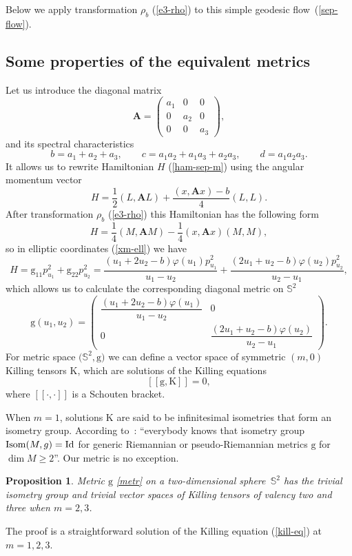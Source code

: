 \documentclass[10pt,a4paper]{amsart}
\numberwithin{equation}{section}
\newtheorem{Proposition}[Theorem]{Proposition}
 { \theoremstyle{definition}
\newtheorem{Definition}[Theorem]{Definition}
\newtheorem{Note}[Theorem]{Note}
\newtheorem{Example}[Theorem]{Example}
\newtheorem{Remark}[Theorem]{Remark} }
\begin{document}
Below we apply transformation $\rho_b$ (\ref{e3-rho}) to this simple geodesic flow~(\ref{sep-flow}).


\subsection{Some properties of the equivalent metrics}
Let us introduce the diagonal matrix
\[
\mathbf A=\left(
 \begin{matrix}
 {a}_1 & 0 & 0 \\
 0 & {a}_2 & 0 \\
 0 & 0 & {a}_3
 \end{matrix}
 \right) ,
\]
and its spectral characteristics
\begin{equation}\label{bcd}
b=a_1+a_2+a_3 ,\qquad c=a_1a_2+a_1a_3+a_2a_3 ,\qquad d=a_1a_2a_3.
\end{equation}
It allows us to rewrite Hamiltonian $H$ (\ref{ham-sep-m}) using the angular momentum vector
\[
H=\dfrac{1}{2}(L,\mathbf A L) +\dfrac{(x,\mathbf A x) - b}{4} (L,L) .
\]
After transformation $\rho_b$ (\ref{e3-rho}) this Hamiltonian has the following form
\begin{equation}\label{Hams}
H=\frac{1}{4}(M,\mathbf AM)-\frac{1}{4}(x,\mathbf Ax)(M,M) ,
\end{equation}
so in elliptic coordinates (\ref{xm-ell}) we have
\begin{equation}\label{H}
H= \mathrm g_{11} p_{u_1}^2+\mathrm g_{22}p_{u_2}^2=\frac{(u_1+2u_2-b)\varphi(u_1)p_{u_1}^2}{u_1-u_2}+\frac{( 2u_1 + u_2-b)\varphi(u_2)p_{u_2}^2}{u_2 - u_1} ,
\end{equation}
which allows us to calculate the corresponding diagonal metric on $\mathbb S^2$
\begin{equation}\label{metr}
\mathrm g(u_1,u_2)=\left( \begin{matrix}
 \dfrac{(u_1+2u_2-b)\varphi(u_1)}{u_1-u_2} &0 \\
 0 &\dfrac{( 2u_1 + u_2-b)\varphi(u_2)}{u_2 - u_1}
 \end{matrix} \right) .
\end{equation}
For metric space $\big(\mathbb S^2,\mathrm g\big) $ we can define a vector space of symmetric $ (m, 0)$ Killing tensors $\mathrm K$, which are solutions of the Killing equations
\begin{equation}\label{kill-eq}
[\![\mathrm g, \mathrm K]\!]=0 ,
\end{equation}
where $[\![\cdot,\cdot]\!]$ is a Schouten bracket.

When $m = 1$, solutions $\mathrm K$ are said to be infinitesimal isometries that form an isometry group. According to~\cite{grom99}: ``everybody knows that isometry group ${\rm Isom}(M, g) = {\rm Id}$ for generic Riemannian or pseudo-Riemannian metrics $\mathrm g $ for $\dim M\geq 2$''. Our metric is no exception.
\begin{Proposition}
Metric $\mathrm g$ \eqref{metr} on a two-dimensional sphere~$\mathbb S^2$ has the trivial isometry group and trivial vector spaces of Killing tensors of valency two and three when $m=2,3$.
\end{Proposition}
\par\noindent
The proof is a straightforward solution of the Killing equation (\ref{kill-eq}) at $m=1,2,3$.
\end{document}
